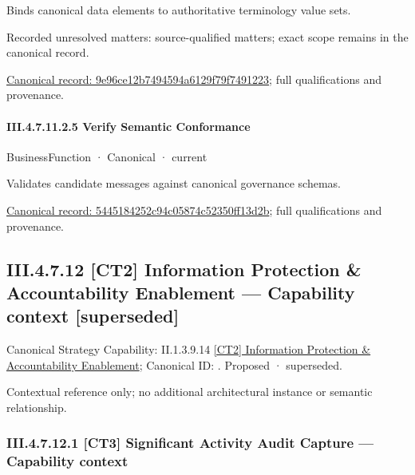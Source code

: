 Binds canonical data elements to authoritative terminology value sets.


{\small Recorded unresolved matters: source-qualified matters; exact scope remains in the canonical record.}\par
{\footnotesize \href{../../../../continuum/business/business-function/9e96ce12b7494594a6129f79f7491223.md}{Canonical record: 9e96ce12b7494594a6129f79f7491223}; full qualifications and provenance.}\par
\paragraph*{III.4.7.11.2.5 Verify Semantic Conformance}
\label{navigation:III.4.7.11.2.5}

\label{element:5445184252c94c05874c52350ff13d2b}
{\small BusinessFunction · Canonical · current}\par

Validates candidate messages against canonical governance schemas.


{\footnotesize \href{../../../../continuum/business/business-function/5445184252c94c05874c52350ff13d2b.md}{Canonical record: 5445184252c94c05874c52350ff13d2b}; full qualifications and provenance.}\par
\subsection*{III.4.7.12 [CT2] Information Protection \& Accountability Enablement — Capability context [superseded]}
\label{navigation:III.4.7.12}

{\small Canonical Strategy Capability: II.1.3.9.14 \hyperref[element:e922cba7cf1d4ebeb9abf6472a3803ce]{[CT2] Information Protection \& Accountability Enablement}; Canonical ID: \texttt{}. Proposed · superseded.}\par
Contextual reference only; no additional architectural instance or semantic relationship.\par
\subsubsection*{III.4.7.12.1 [CT3] Significant Activity Audit Capture — Capability context}
\label{navigation:III.4.7.12.1}

